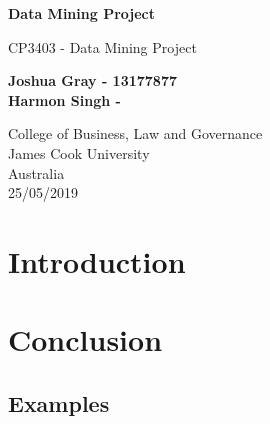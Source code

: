 \documentclass[11pt]{article}
\begin{document}
	
	\begin{titlepage}
		\begin{center}
			\vspace*{1cm}
			
			\Huge
			\textbf{Data Mining Project}
			
			\vspace{0.5cm}
			\LARGE
			CP3403 - Data Mining Project
			
			\vspace{1.5cm}
			
			\textbf{Joshua Gray - 13177877}\\
			\textbf{Harmon Singh - }		
			
			\vfill			
					
			\vspace{0.8cm}
			
			
			\Large
			College of Business, Law and Governance\\
			James Cook University\\
			Australia\\
			25/05/2019
			
		\end{center}
	\end{titlepage}
	
	\tableofcontents
	\listoffigures
	\listoftables
	\newpage
	
	\section{Introduction}
	
	\section{Conclusion}
	
	\newpage
	\nocite{*}	
	
	
	\newpage
	\begin{appendices}
		\section{Examples}
		
	\end{appendices}	
\end{document}
